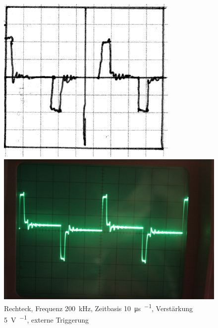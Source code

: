 \begin{figure}[htbp]
	\centering
	\begin{minipage}{.45\linewidth}
	\includegraphics[width=\linewidth]{Skizzen/IMG_0774-1500.jpg}
	\end{minipage}
	\hfill
	\begin{minipage}{.45\linewidth}
	\includegraphics[width=\linewidth]{Fotos/IMG_0774-1500.jpg}
	\end{minipage}
	\caption{%
		Rechteck, Frequenz \SI{200}{\kilo\hertz},
		Zeitbasis \SI{10}{\micro\second\per\division},
		Verstärkung \SI{5}{\volt\per\division},
		externe Triggerung
	}
	\label{fig:0774}
\end{figure}

